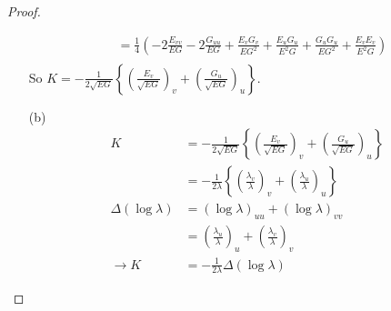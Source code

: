 \documentclass[10pt,a4paper]{article}
\begin{document}
\begin{proof}
\begin{enumerate}
\begin{align*}
&=\frac{1}{4}\left(-2\frac{E_{vv}}{EG}-2\frac{G_{uu}}{EG}+\frac{E_vG_v}{EG^2}+\frac{E_uG_u}{E^2G}+\frac{G_uG_u}{EG^2}+\frac{E_vE_v}{E^2G}\right)\\
\end{align*}
So $K=-\frac{1}{2\sqrt{EG}}\left\{\left(\frac{E_v}{\sqrt{EG}}\right)_v+\left(\frac{G_u}{\sqrt{EG}}\right)_u\right\}$.
\item[(b)]
\begin{align*}
K&=-\frac{1}{2\sqrt{EG}}\left\{\left(\frac{E_v}{\sqrt{EG}}\right)_v+\left(\frac{G_u}{\sqrt{EG}}\right)_u\right\}\\
&=-\frac{1}{2\lambda}\left\{\left(\frac{\lambda_v}{\lambda}\right)_v+\left(\frac{\lambda_u}{\lambda}\right)_u\right\}\\
\Delta(\log\lambda)&=(\log\lambda)_{uu}+(\log\lambda)_{vv}\\
&=\left(\frac{\lambda_u}{\lambda}\right)_u+\left(\frac{\lambda_v}{\lambda}\right)_v\\
\rightarrow K&=-\frac{1}{2\lambda}\Delta(\log\lambda)
\end{align*}
\end{enumerate}
\end{proof}
\end{document}
